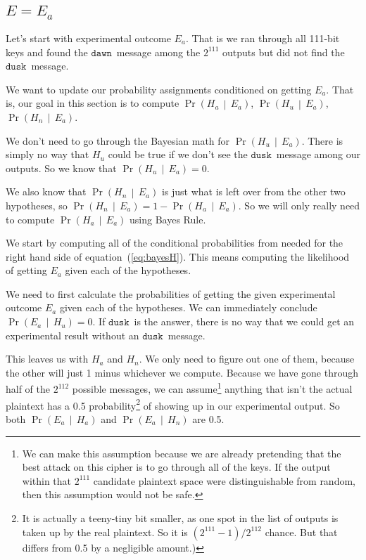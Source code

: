 \documentclass[11pt]{article}
\newcommand{\prob}[1]{\ensuremath{\operatorname{Pr}\left( #1 \right)}}
\newcommand{\condprob}[2]{\prob{#1\, \middle|\, #2}}
\newcommand\mdusk{\ensuremath{\mathtt{dusk}}}
\newcommand\mdawn{\ensuremath{\mathtt{dawn}}}
\begin{document}
\subsection{\(E = E_a\)}

Let's start with experimental outcome $E_a$. That is we ran through all 111-bit keys and found the \mdawn\ message among the $2^{111}$ outputs but did not find the \mdusk\ message.

We want to update our probability assignments conditioned on getting $E_a$. That is, our goal in this section is to compute \condprob{H_a}{E_a}, \condprob{H_u}{E_a}, \condprob{H_n}{E_a}.

We don't need to go through the Bayesian math for \condprob{H_u}{E_a}.
There is simply no way that $H_u$ could be true if we don't see the \mdusk\ message among our outputs. So we know that $\condprob{H_u}{E_a} = 0$.

We also know that \condprob{H_n}{E_a} is just what is left over from the other two hypotheses, so $\condprob{H_n}{E_a} = 1 - \condprob{H_a}{E_a}$.
So we will only really need to compute \condprob{H_a}{E_a} using Bayes Rule.


We start by computing all of the conditional probabilities from needed for the right hand side of equation~(\ref{eq:bayesH}). This means computing the likelihood of getting $E_a$ given each of the hypotheses. 

We need to first calculate the probabilities of getting the given experimental outcome $E_a$ given each of the hypotheses.
We can immediately conclude $\condprob{E_a}{H_u} = 0$.
If \mdusk\ is the answer, there is no way that we could get an experimental result without an \mdusk\ message.

This leaves us with $H_a$ and $H_n$.
We only need to figure out one of them, because the other will just 1 minus whichever we compute.
Because we have gone through half of the $2^{112}$ possible messages,
we can assume\footnote{%
    We can make this assumption because we are already pretending that the best attack on this cipher is to go through all of the keys. If the output within that $2^{111}$ candidate plaintext space were distinguishable from random, then this assumption would not be safe.
}
anything that isn't the actual plaintext has a 0.5 probability\footnote{%
    It is actually a teeny-tiny bit smaller, as one spot in the list of outputs
    is taken up by the real plaintext. So it is $(2^{111}-1)/2^{112}$ chance.
    But that differs from 0.5 by a negligible amount.)
}
of showing up in our experimental output.
So both \condprob{E_a}{H_a} and \condprob{E_a}{H_n} are 0.5.
\end{document}
